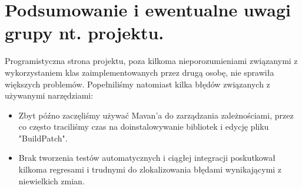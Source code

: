 \documentclass[a4paper,12pt]{article}
\begin{document}
\section{Podsumowanie i ewentualne uwagi grupy nt. projektu. }

Programistyczna strona projektu, poza kilkoma nieporozumieniami związanymi z wykorzystaniem klas zaimplementowanych przez drugą osobę, nie sprawiła większych problemów. Popełniliśmy natomiast kilka błędów związanych z używanymi narzędziami:
\begin{itemize}
\item Zbyt późno zaczęliśmy używać Mavan'a do zarządzania zależnościami, przez co często traciliśmy czas na doinstalowywanie bibliotek i edycję pliku "BuildPatch".

\item Brak tworzenia testów automatycznych i ciągłej integracji poskutkował kilkoma regresami i trudnymi do zlokalizowania błędami wynikającymi z niewielkich zmian. 
\end{itemize}
\end{document}
